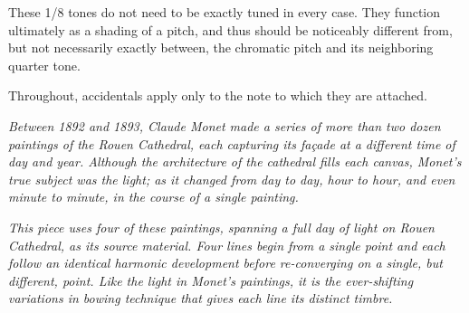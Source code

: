 \documentclass{article}
\begin{document}
These 1/8 tones do not need to be exactly tuned in every case. They function ultimately as a shading of a pitch, and thus should be
noticeably different from, but not necessarily exactly between, the chromatic pitch and its neighboring quarter tone.

Throughout, accidentals apply only to the note to which they are attached.

\vfill
\textsl{
Between 1892 and 1893, Claude Monet made a series of more than two dozen paintings
of the Rouen Cathedral, each capturing its façade at a different time of day and year.
Although the architecture of the cathedral fills each canvas, Monet's true subject was
the light; as it changed from day to day, hour to hour, and even minute to minute, in
the course of a single painting.
}

\textsl{
This piece uses four of these paintings, spanning a full day of light on Rouen
Cathedral, as its source material. Four lines begin from a single point and each
follow an identical harmonic development before re-converging on a single, but
different, point. Like the light in Monet's paintings, it is the ever-shifting
variations in bowing technique that gives each line its distinct timbre.
}
\end{document}
